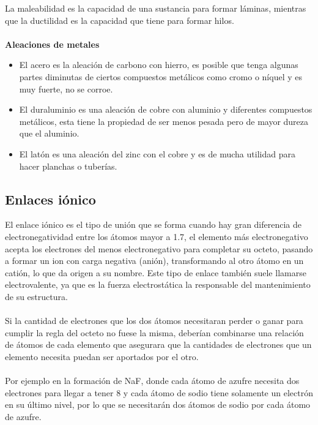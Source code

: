 \documentclass[12pt]{article}
\begin{document}
               La maleabilidad es la capacidad de una sustancia para formar láminas, mientras que la ductilidad es la capacidad que tiene para formar hilos.\\\\
               \textbf{Aleaciones de metales}
               
               \begin{itemize}
               
                    \item El acero es la aleación de carbono con hierro, es posible que tenga algunas partes diminutas de ciertos compuestos metálicos como cromo o níquel y es muy fuerte, no se corroe.
                    \item El duraluminio es una aleación de cobre con aluminio y diferentes compuestos metálicos, esta tiene la propiedad de ser menos pesada pero de mayor dureza que el aluminio.
                    \item El latón es una aleación del zinc con el cobre y es de mucha utilidad para hacer planchas o tuberías.
               \end{itemize}
             
          \subsection{Enlaces iónico}\label{sec:Enlaces iónico}
               El enlace iónico es el tipo de unión que se forma cuando hay gran diferencia de electronegatividad entre los átomos mayor a 1.7, el elemento más electronegativo acepta los electrones del menos electronegativo para completar su octeto, pasando a formar un ion con carga negativa (anión), transformando al otro átomo en un catión, lo que da origen a su nombre. Este tipo de enlace también suele llamarse electrovalente, ya que es la fuerza electrostática la responsable del mantenimiento de su estructura.\\\\
               Si la cantidad de electrones que los dos átomos necesitaran perder o ganar para cumplir la regla del octeto no fuese la misma, deberían combinarse una relación de átomos de cada elemento que asegurara que la cantidades de electrones que un elemento necesita puedan ser aportados por el otro.\\\\
               Por ejemplo en la formación de NaF, donde cada átomo de azufre necesita dos electrones para llegar a tener 8 y cada átomo de sodio tiene solamente un electrón en su último nivel, por lo que se necesitarán dos átomos de sodio por cada átomo de azufre.
\end{document}
